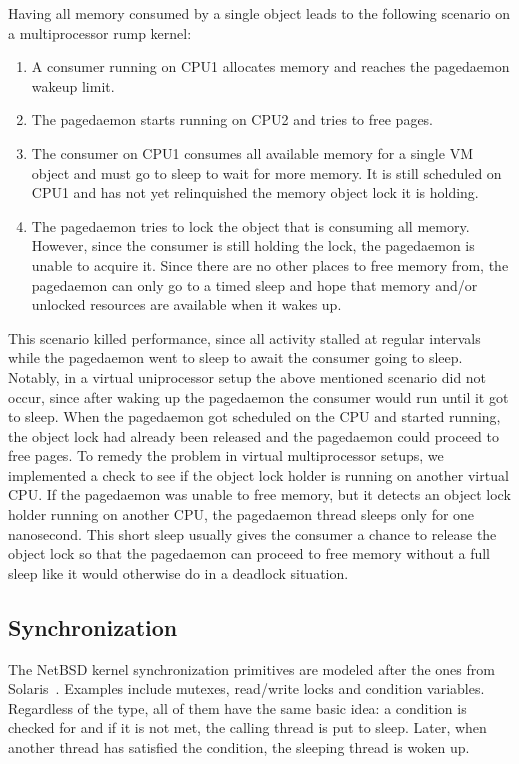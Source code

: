 Having all memory consumed by a single object leads to the following
scenario on a multiprocessor rump kernel:

\begin{enumerate}
\item   A consumer running on CPU1 allocates memory and reaches
	the pagedaemon wakeup limit.
\item	The pagedaemon starts running on CPU2 and tries to free pages.
\item   The consumer on CPU1 consumes all available memory for a
	single VM object and must go to sleep to wait for more
	memory.  It is still scheduled on CPU1 and has not yet
	relinquished the memory object lock it is holding.
\item   The pagedaemon tries to lock the object that is consuming all
	memory.  However, since the consumer is still holding the
	lock, the pagedaemon is unable to acquire it.  Since there
	are no other places to free memory from, the pagedaemon
	can only go to a timed sleep and hope that memory and/or
	unlocked resources are available when it wakes up.
\end{enumerate}

This scenario killed performance, since all activity stalled at
regular intervals while the pagedaemon went to sleep to await the
consumer going to sleep.  Notably, in a virtual uniprocessor setup
the above mentioned scenario did not occur, since after waking up
the pagedaemon the consumer would run until it got to sleep.  When
the pagedaemon got scheduled on the CPU and started running, the
object lock had already been released and the pagedaemon could
proceed to free pages.  To remedy the problem in virtual multiprocessor
setups, we implemented a check to see if the object lock holder is
running on another virtual CPU.  If the pagedaemon was unable to
free memory, but it detects an object lock holder running on another
CPU, the pagedaemon thread sleeps only for one nanosecond.  This
short sleep usually gives the consumer a chance to release the object
lock so that the pagedaemon can proceed to free memory without a full
sleep like it would otherwise do in a deadlock situation.

\subsection{Synchronization}

The NetBSD kernel synchronization primitives are modeled after
the ones from Solaris~\cite{solarisinternals}.  Examples
include mutexes, read/write locks and condition variables.  Regardless
of the type, all of them have the same basic idea: a condition is
checked for and if it is not met, the calling thread is put to
sleep.  Later, when another thread has satisfied the condition,
the sleeping thread is woken up.

